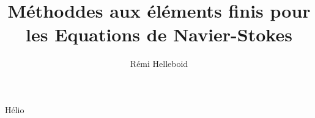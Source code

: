 \documentclass[12pt,a4paper]{article}
\author{Rémi Helleboid}
\title{Méthoddes aux éléments finis pour les Equations de Navier-Stokes}
\begin{document}
Hélio
\end{document}
